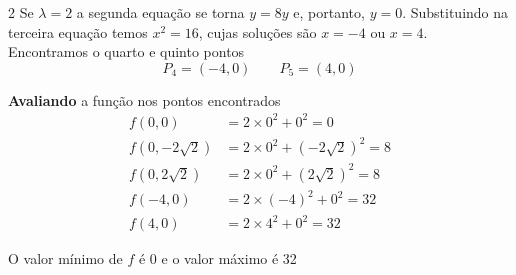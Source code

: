 \documentclass[a4paper,12pt,fleqn]{article}
\begin{document}
\begin{answer}
\begin{multicols*}{2}
  Se $\lambda=2$ a segunda equação se torna $y=8y$ e, portanto, $y=0$.
  Substituindo na terceira equação temos $x^2=16$, cujas soluções são
  $x=-4$ ou $x=4$.  Encontramos o quarto e quinto pontos
  \[
    P_4 = (-4, 0)
    \qquad
    P_5 = (4, 0)
  \]

  \textbf{Avaliando} a função nos pontos encontrados
  \begin{align*}
    f( 0,  0)                    & = 2\times    0^2 +    0^2 =  0                 \\
    f\left( 0, -2\sqrt{2}\right) & = 2\times 0^2 + \left(-2\sqrt{2}\right)^2 = 8 \\
    f\left( 0,  2\sqrt{2}\right) & = 2\times 0^2 + \left( 2\sqrt{2}\right)^2 = 8 \\
    f(-4,  0)                    & = 2\times (-4)^2 +    0^2 = 32                 \\
    f( 4,  0)                    & = 2\times    4^2 +    0^2 = 32
  \end{align*}

  O valor mínimo de $f$ é 0 e o valor máximo é 32
\end{multicols*}
\end{answer}

\end{document}
